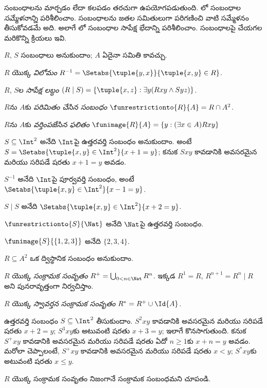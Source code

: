 \documentclass[../../../include/open-logic-section]{subfiles}
\begin{document}

సంబంధాలను మార్చడం లేదా కలపడం తరచుగా ఉపయోగపడుతుంది.
లో సంబంధాల
\emph{సమ్మేళనాన్ని} పరిశీలించాం. సంబంధాలను జతల సమితులుగా
పరిగణించి వాటి సమ్మేళనం తీసుకోవడమే అది.
అలాగే లో సంబంధాల
సాపేక్ష భేదాన్ని పరిశీలించాం. సంబంధాలపై చేయగల మరికొన్ని క్రియలు ఇవి.

\begin{defn} 
$R$, $S$ సంబంధాలు అనుకుందాం; $A$ ఏదైనా సమితి కావచ్చు.

$R$ యొక్క \emph{విలోమం}
$R^{-1} = \Setabs{\tuple{y, x}}{\tuple{x, y} \in R}$.

$R$, $S$ల \emph{సాపేక్ష లబ్ధం}
$(R \mid S) = \{\tuple{x, z} : \exists y(Rxy \land Syz)\}$.

$R$ను $A$కు \emph{పరిమితం చేసిన సంబంధం}
$\funrestrictionto{R}{A}= R \cap A^2$.

$R$ను $A$కు \emph{వర్తింపజేసిన ఫలితం}
$\funimage{R}{A} = \{y : (\exists x \in A)Rxy\}$
\end{defn}

\begin{ex}
$S \subseteq \Int^2$ అనేది $\Int$పై ఉత్తరవర్తి సంబంధం అనుకుందాం.
అంటే $S = \Setabs{\tuple{x, y} \in \Int^2}{x + 1 = y}$;
కనుక $Sxy$ కావడానికి అవసరమైన మరియు సరిపడే షరతు $x + 1 = y$ అవడం.

$S^{-1}$ అనేది $\Int$పై పూర్వవర్తి సంబంధం, అంటే
$\Setabs{\tuple{x,y}\in\Int^2}{x -1 =y}$.

$S\mid S$ అనేది
$ \Setabs{\tuple{x,y}\in\Int^2}{x + 2 =y}$.

$\funrestrictionto{S}{\Nat}$ అనేది $\Nat$పై ఉత్తరవర్తి సంబంధం.

$\funimage{S}{\{1,2,3\}}$ అనేది $\{2, 3, 4\}$.
\end{ex}

\begin{defn}[సంక్రామక సంవృతం] $R \subseteq A^2$ ఒక ద్విస్థానిక సంబంధం అనుకుందాం.
	
$R$ యొక్క \emph{సంక్రామక సంవృతం}
$R^+ = \bigcup_{0 < n \in \Nat} R^n$.
ఇక్కడ $R^1 = R$, $R^{n+1} = R^n \mid R$ అని పునరావృత్తంగా నిర్వచిస్తాం.

$R$ యొక్క \emph{స్వావర్తన సంక్రామక సంవృతం}
$R^* = R^+ \cup \Id{A}$.
\end{defn}

\begin{ex}
ఉత్తరవర్తి సంబంధం $S \subseteq \Int^2$ తీసుకుందాం.
$S^2xy$ కావడానికి అవసరమైన మరియు సరిపడే షరతు $x + 2 = y$;
$S^3xy$కు అటువంటి షరతు $x + 3 = y$; ఇలాగే కొనసాగుతుంది.
కనుక $S^+xy$ కావడానికి అవసరమైన మరియు సరిపడే షరతు
ఏదో $n \geq 1$కు $x + n = y$ అవడం.
మరోలా చెప్పాలంటే, $S^+xy$ కావడానికి అవసరమైన మరియు సరిపడే షరతు $x < y$;
$S^*xy$కు అటువంటి షరతు $x \le y$.
\end{ex}

\begin{prob}
$R$ యొక్క సంక్రామక సంవృతం నిజంగానే సంక్రామక సంబంధమని చూపండి.
\end{prob}
\end{document}
